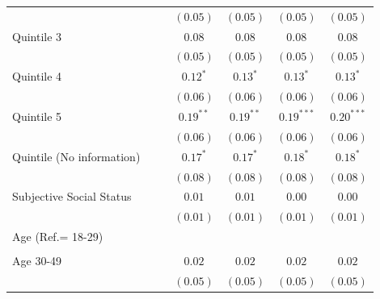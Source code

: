 \documentclass[
  12pt,
  a4paper,
]{article}
\begin{document}
\begin{table}[!ht]
\begin{center}
{\begin{tabular}{l c c c c c c}
                                    &               &               & $(0.05)$      & $(0.05)$      & $(0.05)$      & $(0.05)$      \\
\quad Quintile 3                    &               &               & $0.08$        & $0.08$        & $0.08$        & $0.08$        \\
                                    &               &               & $(0.05)$      & $(0.05)$      & $(0.05)$      & $(0.05)$      \\
\quad Quintile 4                    &               &               & $0.12^{*}$    & $0.13^{*}$    & $0.13^{*}$    & $0.13^{*}$    \\
                                    &               &               & $(0.06)$      & $(0.06)$      & $(0.06)$      & $(0.06)$      \\
\quad Quintile 5                    &               &               & $0.19^{**}$   & $0.19^{**}$   & $0.19^{***}$  & $0.20^{***}$  \\
                                    &               &               & $(0.06)$      & $(0.06)$      & $(0.06)$      & $(0.06)$      \\
\quad Quintile (No information)     &               &               & $0.17^{*}$    & $0.17^{*}$    & $0.18^{*}$    & $0.18^{*}$    \\
                                    &               &               & $(0.08)$      & $(0.08)$      & $(0.08)$      & $(0.08)$      \\
Subjective Social Status            &               &               & $0.01$        & $0.01$        & $0.00$        & $0.00$        \\
                                    &               &               & $(0.01)$      & $(0.01)$      & $(0.01)$      & $(0.01)$      \\
Age (Ref.= 18-29)                   &               &               &               &               &               &               \\
                                    &               &               &               &               &               &               \\
\quad Age 30-49                     &               &               & $0.02$        & $0.02$        & $0.02$        & $0.02$        \\
                                    &               &               & $(0.05)$      & $(0.05)$      & $(0.05)$      & $(0.05)$      \\

\end{tabular}}
\end{center}
\end{table}
\end{document}
